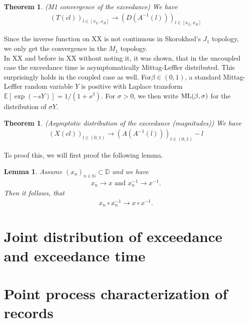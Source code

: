 \documentclass[12pt]{article}
\newtheorem{theorem}[equation]{Theorem}
\newtheorem{lemma}[equation]{Lemma}
\newcommand{\N}{\mathbb{N}}
\newcommand{\E}{\mathbb{E}}
\newcommand{\1}{\mathbf 1}
\newcommand{\D}{\mathbb{D}}
\begin{document}
\begin{theorem}(M1 convergence of the exceedance)
We have 
\begin{align*}
(T(cl))_{l \in [x_L,x_R]}  \rightarrow (D(A^{-1}(l)))_{l \in [x_L,x_R]} 
\end{align*}
\end{theorem}
Since the inverse function on XX is not continuous in Skorokhod's $J_1$ topology, we only get the convergence in the $M_1$ topology.\\
In XX and before in XX without noting it, it was shown, that in the uncoupled case the exceedance time is asymptomatically Mittag-Leffler distributed. This surprisingly holds in the coupled case as well. For$\beta \in (0,1)$, a standard Mittag-Leffler 
random variable $Y$ is positive with Laplace transform
$\E[\exp(-s Y)] = 1/(1+s^\beta)$. For $\sigma > 0$, we then write 
${\rm ML}(\beta, \sigma)$ for the distribution of $\sigma Y$. \\


\begin{theorem}(Asymptotic distribution of the exceedance (magnitudes))
We have 
\begin{align*}
(X(cl))_{l \in (0,1)} \rightarrow (A(A^{-1}(l)))_{l \in (0,1)} - l
\end{align*}
\end{theorem}

To proof this, we will first proof the following lemma.

\begin{lemma} 
Assume $(x_n)_{n \in \N} \subset \D$ and we have
\begin{align*}
x_n \rightarrow x  \text{ and }  x_n^{-1} \rightarrow x^{-1}. 
\end{align*}
Then it follows, that
\begin{align*}
x_n \circ x_n^{-1} \rightarrow x \circ x^{-1}.
\end{align*}
\end{lemma}


\section{Joint distribution of exceedance and exceedance time}


\section{Point process characterization of records}
\label{sec:records}
\end{document}
